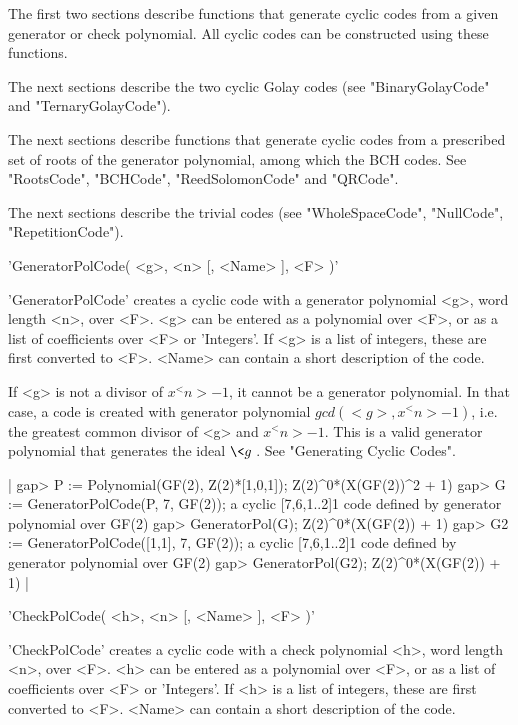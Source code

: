The first two sections describe functions that generate cyclic codes from
a   given generator  or  check   polynomial.   All  cyclic codes  can  be
constructed using these functions.

The  next   sections describe    the   two   cyclic Golay    codes   (see
"BinaryGolayCode" and "TernaryGolayCode").

The next  sections describe functions that generate  cyclic  codes from a
prescribed set of roots of the generator  polynomial, among which the BCH
codes.  See "RootsCode", "BCHCode", "ReedSolomonCode" and "QRCode".

The next   sections  describe the  trivial   codes (see "WholeSpaceCode",
"NullCode", "RepetitionCode").


'GeneratorPolCode( <g>, <n> [, <Name> ], <F> )'

'GeneratorPolCode' creates a cyclic code with a generator polynomial <g>,
word length <n>,  over <F>. <g> can be  entered as a polynomial over <F>,
or as a list of coefficients over <F> or 'Integers'. If <g>  is a list of
integers, these  are first converted to <F>.  <Name> can contain  a short
description of the code.

If  <g>   is not   a divisor   of $x^<n>-1$,   it cannot  be  a generator
polynomial. In  that case,  a code  is created  with generator polynomial
$gcd( <g>,  x^<n>-1  )$, i.e.   the  greatest common divisor  of  <g> and
$x^<n>-1$. This is a valid  generator polynomial that generates the ideal
$\<g\>$. See "Generating Cyclic Codes".

|    gap> P := Polynomial(GF(2), Z(2)*[1,0,1]);
    Z(2)^0*(X(GF(2))^2 + 1)
    gap> G := GeneratorPolCode(P, 7, GF(2));
    a cyclic [7,6,1..2]1 code defined by generator polynomial over GF(2)
    gap> GeneratorPol(G);
    Z(2)^0*(X(GF(2)) + 1)
    gap> G2 := GeneratorPolCode([1,1], 7, GF(2));
    a cyclic [7,6,1..2]1 code defined by generator polynomial over GF(2)
    gap> GeneratorPol(G2);
    Z(2)^0*(X(GF(2)) + 1) |


'CheckPolCode( <h>, <n> [, <Name> ], <F> )'

'CheckPolCode' creates  a cyclic code  with a  check polynomial <h>, word
length <n>, over <F>. <h> can be entered as  a polynomial over <F>, or as
a  list  of coefficients over <F>   or 'Integers'. If  <h>  is  a list of
integers, these are  first converted to <F>.  <Name> can contain  a short
description of the code.

